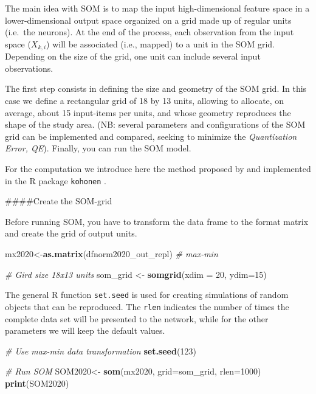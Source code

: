 \documentclass[
]{article}
\newenvironment{Shaded}{\begin{snugshade}}{\end{snugshade}}
\newcommand{\AttributeTok}[1]{\textcolor[rgb]{0.13,0.29,0.53}{#1}}
\newcommand{\CommentTok}[1]{\textcolor[rgb]{0.56,0.35,0.01}{\textit{#1}}}
\newcommand{\DecValTok}[1]{\textcolor[rgb]{0.00,0.00,0.81}{#1}}
\newcommand{\FunctionTok}[1]{\textcolor[rgb]{0.13,0.29,0.53}{\textbf{#1}}}
\newcommand{\NormalTok}[1]{#1}
\newcommand{\OtherTok}[1]{\textcolor[rgb]{0.56,0.35,0.01}{#1}}
\begin{document}
The main idea with SOM is to map the input high-dimensional feature space in a lower-dimensional output space organized on a grid made up of regular units (i.e.~the neurons).
At the end of the process, each observation from the input space (\(X_{k,i}\)) will be associated (i.e., mapped) to a unit in the SOM grid.
Depending on the size of the grid, one unit can include several input observations.

The first step consists in defining the size and geometry of the SOM grid.
In this case we define a rectangular grid of 18 by 13 units, allowing to allocate, on average, about 15 input-items per units, and whose geometry reproduces the shape of the study area.
(NB: several parameters and configurations of the SOM grid can be implemented and compared, seeking to minimize the \emph{Quantization Error, QE}).
Finally, you can run the SOM model.

For the computation we introduce here the method proposed by \citep{kohonen_self-organized_1982} and implemented in the R package \texttt{kohonen} \citep{library_SOM}.

\#\#\#\#Create the SOM-grid

Before running SOM, you have to transform the data frame to the format matrix and create the grid of output units.

\begin{Shaded}
\begin{Highlighting}[]
\NormalTok{mx2020}\OtherTok{\textless{}{-}}\FunctionTok{as.matrix}\NormalTok{(dfnorm2020\_out\_repl) }\CommentTok{\# max{-}min}
\end{Highlighting}
\end{Shaded}

\begin{Shaded}
\begin{Highlighting}[]
\CommentTok{\# Gird size 18x13 units}
\NormalTok{som\_grid }\OtherTok{\textless{}{-}} \FunctionTok{somgrid}\NormalTok{(}\AttributeTok{xdim =} \DecValTok{20}\NormalTok{, }\AttributeTok{ydim=}\DecValTok{15}\NormalTok{) }
\end{Highlighting}
\end{Shaded}

The general R function \texttt{set.seed} is used for creating simulations of random objects that can be reproduced.
The \texttt{rlen} indicates the number of times the complete data set will be presented to the network, while for the other parameters we will keep the default values.

\begin{Shaded}
\begin{Highlighting}[]
\CommentTok{\# Use max{-}min data transformation}
\FunctionTok{set.seed}\NormalTok{(}\DecValTok{123}\NormalTok{) }

\CommentTok{\# Run SOM}
\NormalTok{SOM2020}\OtherTok{\textless{}{-}} \FunctionTok{som}\NormalTok{(mx2020,}
               \AttributeTok{grid=}\NormalTok{som\_grid, }
               \AttributeTok{rlen=}\DecValTok{1000}\NormalTok{)}
\FunctionTok{print}\NormalTok{(SOM2020)}
\end{Highlighting}
\end{Shaded}
\end{document}
